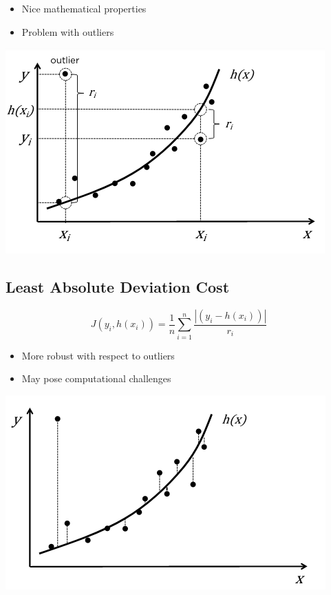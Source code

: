 \documentclass{article}[18pt]
\begin{document}
\begin{itemize}
	\item Nice mathematical properties
	\item Problem with outliers
\end{itemize}

\begin{center}
	\includegraphics[scale=0.7]{"Least Squares Deviation"}
\end{center}
\subsection{Least Absolute Deviation Cost}
$$J(y_i,h(x_i))=\dfrac{1}{n}\sum_{i=1}^{n}\dfrac{|(y_i-h(x_i))|}{r_i}$$
\begin{itemize}
	\item More robust with respect to outliers
	\item May pose computational challenges
\end{itemize}
\begin{center}
	\includegraphics[scale=0.7]{"Least Absolute Deviation"}
\end{center}
\end{document}
